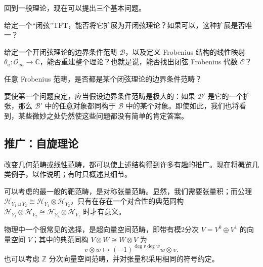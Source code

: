 回到一般理论，现在可以提出三个基本问题。

\begin{problem*}[(i)]
给定一个“闭弦”TFT，能否将它扩展为开闭弦理论？如果可以，这种扩展是否唯一？
\end{problem*}

\begin{problem*}[(ii)]
给定一个开闭弦理论的边界条件范畴 $\mathcal{B}$，以及定义 Frobenius 结构的线性映射 $\theta_a\colon\mathcal{O}_{aa}\to\mathbb{C}$，能否重建整个理论？也就是说，能否找出闭弦 Frobenius 代数 $\mathcal{C}$？
\end{problem*}

\begin{problem*}[(iii)]
任意 Frobenius 范畴，是否都是某个闭弦理论的边界条件范畴？
\end{problem*}

要使第一个问题良定，应当假设边界条件范畴是极大的：如果 $\mathcal{B}'$ 是它的一个扩张，那么 $\mathcal{B}'$ 中的任意对象都同构于 $\mathcal{B}$ 中的某个对象。即使如此，我们也将看到，某些微妙之处仍然使这些问题都没有简单的肯定答案。

\subsection{推广：自旋理论}\label{sec:2.1.6}

改变几何范畴或线性范畴，都可以使上述结构得到许多有趣的推广。现在将概览几类例子，以作说明；有时只概述其细节。

可以考虑的最一般的靶范畴，是对称张量范畴。显然，我们需要张量积；而公理 $\mathcal{H}_{Y_1\sqcup Y_2}\cong\mathcal{H}_{Y_1}\otimes\mathcal{H}_{Y_2}$，只有在存在一个对合性的典范同构 $\mathcal{H}_{Y_1}\otimes\mathcal{H}_{Y_2}\cong\mathcal{H}_{Y_2}\otimes\mathcal{H}_{Y_1}$ 时才有意义。

物理中一个很常见的选择，是超向量空间范畴，即带有模2分次 $V=V^0\oplus V^1$ 的向量空间 $V$；其中的典范同构 $V\otimes W\cong W\otimes V$ 为
\[
v\otimes w\longmapsto(-1)^{\deg v\deg w}w\otimes v.
\]
也可以考虑 $\mathbb{Z}$ 分次向量空间范畴，并对张量积采用相同的符号约定。


